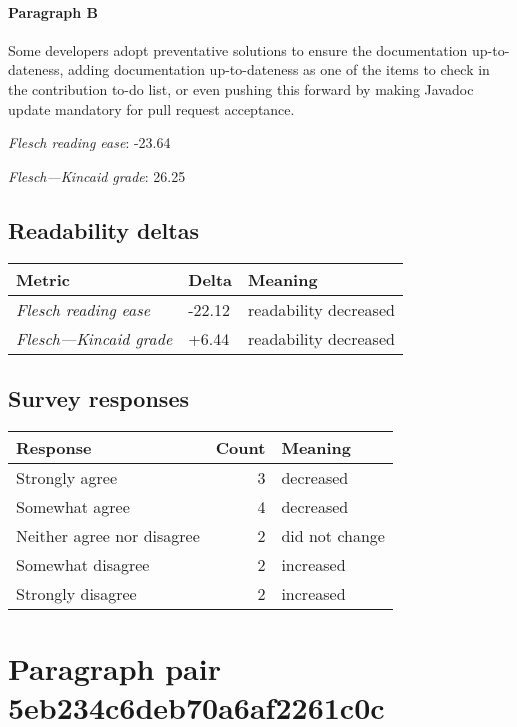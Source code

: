 \paragraph{Paragraph B}
Some developers adopt preventative solutions to ensure the documentation up-to-dateness, adding documentation up-to-dateness as one of the items to check in the contribution to-do list, or even pushing this forward by making Javadoc update mandatory for pull request acceptance.\par\medskip
\emph{Flesch reading ease}: -23.64\par
\emph{Flesch---Kincaid grade}: 26.25

\subsection{Readability deltas}

\begin{tabular}{lll}
\toprule
               \textbf{Metric} & \textbf{Delta} &       \textbf{Meaning} \\
\midrule
    \emph{Flesch reading ease} &         -22.12 &  readability decreased \\
 \emph{Flesch---Kincaid grade} &          +6.44 &  readability decreased \\
\bottomrule
\end{tabular}

\subsection{Survey responses}
\begin{tabular}{lrl}
\toprule
          \textbf{Response} &  \textbf{Count} & \textbf{Meaning} \\
\midrule
             Strongly agree &               3 &        decreased \\
             Somewhat agree &               4 &        decreased \\
 Neither agree nor disagree &               2 &   did not change \\
          Somewhat disagree &               2 &        increased \\
          Strongly disagree &               2 &        increased \\
\bottomrule
\end{tabular}

\section{Paragraph pair 5eb234c6deb70a6af2261c0c}
